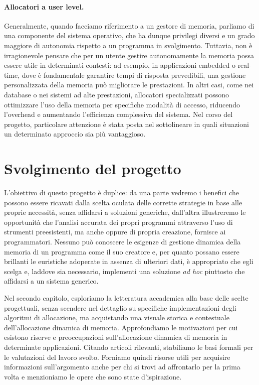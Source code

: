 \paragraph{Allocatori a user level.} 
Generalmente, quando facciamo riferimento a un gestore di memoria, parliamo di una componente del sistema operativo, che ha dunque privilegi diversi e un grado maggiore di autonomia rispetto a un programma in svolgimento. Tuttavia, non è irragionevole pensare che per un utente gestire autonomamente la memoria possa essere utile in determinati contesti: ad esempio, in applicazioni embedded o real-time, dove è fondamentale garantire tempi di risposta prevedibili, una gestione personalizzata della memoria può migliorare le prestazioni. In altri casi, come nei database o nei sistemi ad alte prestazioni, allocatori specializzati possono ottimizzare l'uso della memoria per specifiche modalità di accesso, riducendo l'overhead e aumentando l'efficienza complessiva del sistema. Nel corso del progetto, particolare attenzione è stata posta nel sottolineare in quali situazioni un determinato approccio sia più vantaggioso.

\section{Svolgimento del progetto}
L'obiettivo di questo progetto è duplice: da una parte vedremo i benefici che possono essere ricavati dalla scelta oculata delle corrette strategie in base alle proprie necessità, senza affidarsi a soluzioni generiche, dall'altra illustreremo le opportunità che l'analisi accurata dei propri programmi attraverso l'uso di strumenti preesistenti, ma anche oppure di propria creazione, fornisce ai programmatori. Nessuno può conoscere le esigenze di gestione dinamica della memoria di un programma come il suo creatore e, per quanto possano essere brillanti le euristiche adoperate in assenza di ulteriori dati, è appropriato che egli scelga e, laddove sia necessario, implementi una soluzione \textit{ad hoc} piuttosto che affidarsi a un sistema generico.

Nel secondo capitolo, esploriamo la letteratura accademica alla base delle scelte progettuali, senza scendere nel dettaglio su specifiche implementazioni degli algoritmi di allocazione, ma acquistando una visuale storica e contestuale dell'allocazione dinamica di memoria. Approfondiamo le motivazioni per cui esistono riserve e preoccupazioni sull'allocazione dinamica di memoria in determinate applicazioni. Citando articoli rilevanti, stabiliamo le basi formali per le valutazioni del lavoro svolto. Forniamo quindi risorse utili per acquisire informazioni sull'argomento anche per chi si trovi ad affrontarlo per la prima volta e menzioniamo le opere che sono state d'ispirazione. 

